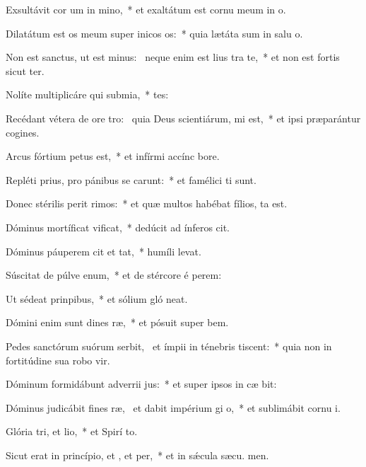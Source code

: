 \item Exsultávit cor um in mino,~* et exaltátum est cornu meum in  o.
\item Dilatátum est os meum super inicos os:~* quia lætáta sum in salu o.
\item Non est sanctus, ut est minus:~\pscross{} neque enim est lius tra te,~* et non est fortis sicut  ter.
\item Nolíte multiplicáre qui submia,~* tes:
\item Recédant vétera de ore tro:~\pscross{} quia Deus scientiárum, mi est,~* et ipsi præparántur cogines.
\item Arcus fórtium petus est,~* et infírmi accínc  bore.
\item Repléti prius, pro pánibus se carunt:~* et famélici ti sunt.
\item Donec stérilis perit rimos:~* et quæ multos habébat fílios, ta est.
\item Dóminus mortíficat  vificat,~* dedúcit ad ínferos  cit.
\item Dóminus páuperem cit et tat,~* humíli  levat.
\item Súscitat de púlve enum,~* et de stércore é perem:
\item Ut sédeat  prinpibus,~* et sólium gló neat.
\item Dómini enim sunt dines ræ,~* et pósuit super  bem.
\item Pedes sanctórum suórum serbit,~\pscross{} et ímpii in ténebris tiscent:~* quia non in fortitúdine sua robo vir.
\item Dóminum formidábunt adverrii jus:~* et super ipsos in cæ bit:
\item Dóminus judicábit fines ræ,~\pscross{} et dabit impérium gi o,~* et sublimábit cornu  i.
\item Glória tri, et lio,~* et Spirí to.
\item Sicut erat in princípio, et , et per,~* et in sǽcula sæcu. men.
